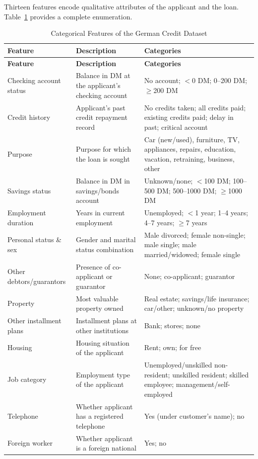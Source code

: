 \documentclass[12pt,a4paper]{article}
\begin{document}
Thirteen features encode qualitative attributes of the applicant and the loan. Table~\ref{tab:cat_features} provides a complete enumeration.

\begin{longtable}{p{3.5cm}p{5cm}p{4cm}}
\caption{Categorical Features of the German Credit Dataset}
\label{tab:cat_features} \\

\toprule
\textbf{Feature} & \textbf{Description} & \textbf{Categories} \\
\midrule
\endfirsthead

\toprule
\textbf{Feature} & \textbf{Description} & \textbf{Categories} \\
\midrule
\endhead

Checking account status & Balance in DM at the applicant's checking account & No account; $<$0 DM; 0--200 DM; $\geq$200 DM \\
Credit history & Applicant's past credit repayment record & No credits taken; all credits paid; existing credits paid; delay in past; critical account \\
Purpose & Purpose for which the loan is sought & Car (new/used), furniture, TV, appliances, repairs, education, vacation, retraining, business, other \\
Savings status & Balance in DM in savings/bonds account & Unknown/none; $<$100 DM; 100--500 DM; 500--1000 DM; $\geq$1000 DM \\
Employment duration & Years in current employment & Unemployed; $<$1 year; 1--4 years; 4--7 years; $\geq$7 years \\
Personal status \& sex & Gender and marital status combination & Male divorced; female non-single; male single; male married/widowed; female single \\
Other debtors/guarantors & Presence of co-applicant or guarantor & None; co-applicant; guarantor \\
Property & Most valuable property owned & Real estate; savings/life insurance; car/other; unknown/no property \\
Other installment plans & Installment plans at other institutions & Bank; stores; none \\
Housing & Housing situation of the applicant & Rent; own; for free \\
Job category & Employment type of the applicant & Unemployed/unskilled non-resident; unskilled resident; skilled employee; management/self-employed \\

Telephone & Whether applicant has a registered telephone & Yes (under customer's name); no \\
Foreign worker & Whether applicant is a foreign national & Yes; no \\

\bottomrule
\end{longtable}
\end{document}
